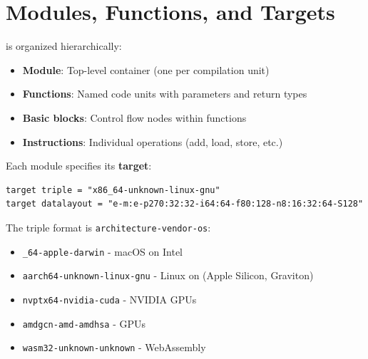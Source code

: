 \section{Modules, Functions, and Targets}

  is organized hierarchically:
\begin{itemize}[noitemsep]
  \item \textbf{Module}: Top-level container (one per compilation unit)
  \item \textbf{Functions}: Named code units with parameters and return types
  \item \textbf{Basic blocks}: Control flow nodes within functions
  \item \textbf{Instructions}: Individual operations (add, load, store, etc.)
\end{itemize}

Each module specifies its \textbf{target}:
\begin{lstlisting}[style=ir]
target triple = "x86_64-unknown-linux-gnu"
target datalayout = "e-m:e-p270:32:32-i64:64-f80:128-n8:16:32:64-S128"
\end{lstlisting}

The triple format is \texttt{architecture-vendor-os}:
\begin{itemize}[noitemsep]
  \item \texttt{\_64-apple-darwin} - macOS on Intel
  \item \texttt{aarch64-unknown-linux-gnu} - Linux on  (Apple Silicon,  Graviton)
  \item \texttt{nvptx64-nvidia-cuda} - NVIDIA GPUs
  \item \texttt{amdgcn-amd-amdhsa} -  GPUs
  \item \texttt{wasm32-unknown-unknown} - WebAssembly
\end{itemize}
